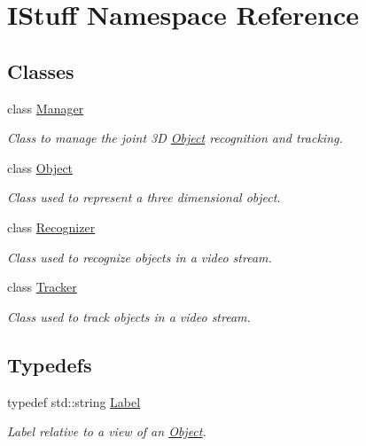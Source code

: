\hypertarget{namespace_i_stuff}{\section{I\-Stuff Namespace Reference}
\label{namespace_i_stuff}
}
\subsection*{Classes}
\begin{DoxyCompactItemize}
\item 
class \hyperlink{class_i_stuff_1_1_manager}{Manager}
\begin{DoxyCompactList}\small\item\em Class to manage the joint 3\-D \hyperlink{class_i_stuff_1_1_object}{Object} recognition and tracking. \end{DoxyCompactList}\item 
class \hyperlink{class_i_stuff_1_1_object}{Object}
\begin{DoxyCompactList}\small\item\em Class used to represent a three dimensional object. \end{DoxyCompactList}\item 
class \hyperlink{class_i_stuff_1_1_recognizer}{Recognizer}
\begin{DoxyCompactList}\small\item\em Class used to recognize objects in a video stream. \end{DoxyCompactList}\item 
class \hyperlink{class_i_stuff_1_1_tracker}{Tracker}
\begin{DoxyCompactList}\small\item\em Class used to track objects in a video stream. \end{DoxyCompactList}\end{DoxyCompactItemize}
\subsection*{Typedefs}
\begin{DoxyCompactItemize}
\item 
typedef std\-::string \hyperlink{namespace_i_stuff_a88882361612ef78eee4224382c8d126b}{Label}
\begin{DoxyCompactList}\small\item\em Label relative to a view of an \hyperlink{class_i_stuff_1_1_object}{Object}. \end{DoxyCompactList}\end{DoxyCompactItemize}


